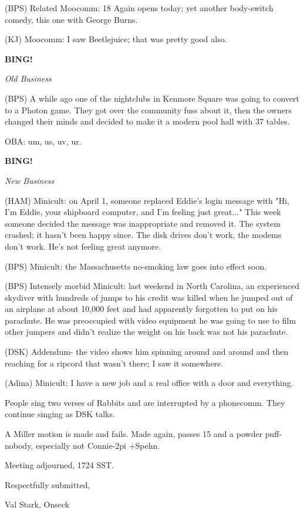 \documentclass[12pt]{article}
\newcommand{\bing}{{\bf BING!} }
\newcommand{\goto}[1]{\bing \vskip 12pt \centerline{{\em{#1}}}}
\begin{document}
(BPS) Related Moocomm: 18 Again opens today; yet another body-switch comedy, this one with George Burns.

(KJ) Moocomm: I saw Beetlejuice; that was pretty good also.

\goto{Old Business}

(BPS) A while ago one of the nightclubs in Kenmore Square was going to convert to a Photon game. They got over the community fuss about it, then the owners changed their minds and decided to make it a modern pool hall with 37 tables.

OBA: um, us, uv, ur.

\goto{New Business}

(HAM) Minicult: on April 1, someone replaced Eddie's login message with "Hi, I'm Eddie, your shipboard computer, and I'm feeling just great..." This week someone decided the message was inappropriate and removed it. The system crashed; it hasn't been happy since. The disk drives don't work, the modems don't work. He's not feeling great anymore.

(BPS) Minicult: the Massachusetts no-smoking law goes into effect soon.

(BPS) Intensely morbid Minicult: last weekend in North Carolina, an experienced skydiver with hundreds of jumps to his credit was killed when he jumped out of an airplane at about 10,000 feet and had apparently forgotten to put on his parachute. He was preoccupied with video equipment he was going to use to film other jumpers and didn't realize the weight on his back was not his parachute.

(DSK) Addendum- the video shows him spinning around and around and then reaching for a ripcord that wasn't there; I saw it somewhere.

(Adina) Minicult: I have a new job and a real office with a door and everything.

People sing two verses of Rabbits and are interrupted by a phonecomm. They continue singing as DSK talks.

A Miller motion is made and fails. Made again, passes 15 and a powder puff-nobody, especially not Connie-2pi +Spehn.

\vspace{12pt}

\noindent
Meeting adjourned, 1724 SST.

\vspace{18pt}

\centerline{Respectfully submitted,}
\centerline{Val Stark, Onseck}
\end{document}

